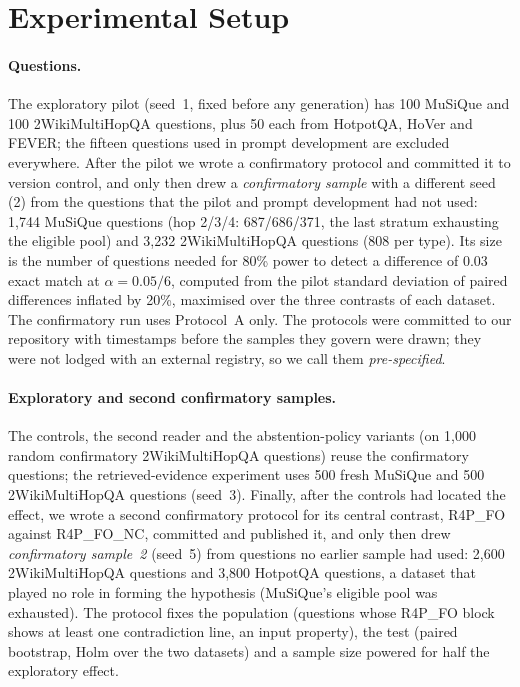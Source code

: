 \section{Experimental Setup}
\label{sec:setup}

\paragraph{Questions.}
The exploratory pilot (seed~1, fixed before any generation) has 100 MuSiQue and 100 2WikiMultiHopQA questions, plus 50 each from HotpotQA, HoVer and FEVER; the fifteen questions used in prompt development are excluded everywhere. After the pilot we wrote a confirmatory protocol and committed it to version control, and only then drew a \emph{confirmatory sample} with a different seed (2) from the questions that the pilot and prompt development had not used: 1{,}744 MuSiQue questions (hop 2/3/4: 687/686/371, the last stratum exhausting the eligible pool) and 3{,}232 2WikiMultiHopQA questions (808 per type). Its size is the number of questions needed for 80\% power to detect a difference of 0.03 exact match at $\alpha=0.05/6$, computed from the pilot standard deviation of paired differences inflated by 20\%, maximised over the three contrasts of each dataset. The confirmatory run uses Protocol~A only. The protocols were committed to our repository with timestamps before the samples they govern were drawn; they were not lodged with an external registry, so we call them \emph{pre-specified}.

\paragraph{Exploratory and second confirmatory samples.}
The controls, the second reader and the abstention-policy variants (on 1{,}000 random confirmatory 2WikiMultiHopQA questions) reuse the confirmatory questions; the retrieved-evidence experiment uses 500 fresh MuSiQue and 500 2WikiMultiHopQA questions (seed~3). Finally, after the controls had located the effect, we wrote a second confirmatory protocol for its central contrast, R4P\_FO against R4P\_FO\_NC, committed and published it, and only then drew \emph{confirmatory sample~2} (seed~5) from questions no earlier sample had used: 2{,}600 2WikiMultiHopQA questions and 3{,}800 HotpotQA questions, a dataset that played no role in forming the hypothesis (MuSiQue's eligible pool was exhausted). The protocol fixes the population (questions whose R4P\_FO block shows at least one contradiction line, an input property), the test (paired bootstrap, Holm over the two datasets) and a sample size powered for half the exploratory effect.

